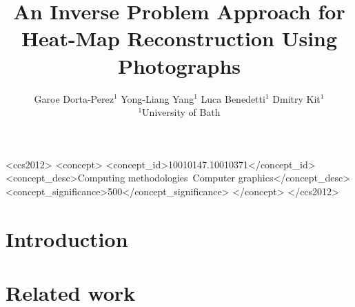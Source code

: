 \documentclass{acmsiggraph}
\title{An Inverse Problem Approach for Heat-Map Reconstruction Using Photographs}
\author{Garoe Dorta-Perez$^1$ \qquad Yong-Liang Yang$^1$ \qquad Luca Benedetti$^1$ \qquad Dmitry Kit$^1$ \\$^1$University of Bath}
\begin{document}


\maketitle

\begin{abstract}



\end{abstract}

%
%
\begin{CCSXML}
<ccs2012>
<concept>
<concept_id>10010147.10010371</concept_id>
<concept_desc>Computing methodologies~Computer graphics</concept_desc>
<concept_significance>500</concept_significance>
</concept>
</ccs2012>
\end{CCSXML}


%
%


\keywordlist

\conceptlist

\printcopyright

\section{Introduction}



\section{Related work}
\end{document}
